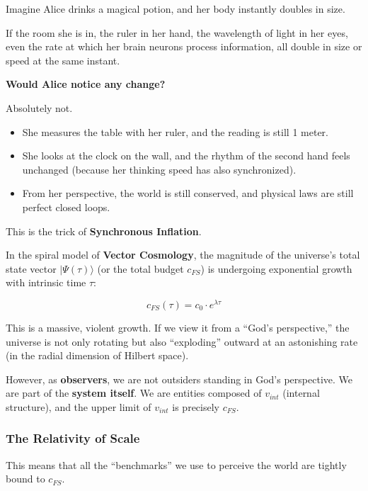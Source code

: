 Imagine Alice drinks a magical potion, and her body instantly doubles in size.

If the room she is in, the ruler in her hand, the wavelength of light in her eyes, even the rate at which her brain neurons process information, all double in size or speed at the same instant.

\textbf{Would Alice notice any change?}

Absolutely not.

\begin{itemize}
\item She measures the table with her ruler, and the reading is still 1 meter.

\item She looks at the clock on the wall, and the rhythm of the second hand feels unchanged (because her thinking speed has also synchronized).

\item From her perspective, the world is still conserved, and physical laws are still perfect closed loops.
\end{itemize}

This is the trick of \textbf{Synchronous Inflation}.

In the spiral model of \textbf{Vector Cosmology}, the magnitude of the universe's total state vector $|\Psi(\tau)\rangle$ (or the total budget $c_{FS}$) is undergoing exponential growth with intrinsic time $\tau$:

\[c_{FS}(\tau) = c_0 \cdot e^{\lambda \tau}\]

This is a massive, violent growth. If we view it from a ``God's perspective,'' the universe is not only rotating but also ``exploding'' outward at an astonishing rate (in the radial dimension of Hilbert space).

However, as \textbf{observers}, we are not outsiders standing in God's perspective. We are part of the \textbf{system itself}. We are entities composed of $v_{int}$ (internal structure), and the upper limit of $v_{int}$ is precisely $c_{FS}$.

\subsubsection{The Relativity of Scale}

This means that all the ``benchmarks'' we use to perceive the world are tightly bound to $c_{FS}$.


